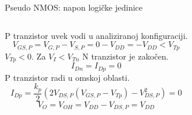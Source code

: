 \begin{frame}[label=09_2-s016]{Pseudo NMOS: napon logičke jedinice}
\begin{columns}[T,onlytextwidth]\centering {}P tranzistor uvek vodi u analiziranoj konfiguraciji.
\[V_{GS,P}=V_{G,P}-V_{S,P}=0-V_{DD}=-V_{DD}<V_{Tp}\]
$V_{Tp}<0$. Za $V_I<V_{Tn}$ N tranzistor je zakočen.
\[I_{Dn}=I_{Dp}=0\]
P tranzistor radi u omskoj oblasti.
\[I_{Dp}=\frac{k_p}2\left(2V_{DS,P}(V_{GS,P}-V_{Tp})-V_{DS,P}^2\right)=0\]
\[V_O=V_{OH}=V_{DD}-V_{DS,P}=V_{DD}\]
\end{columns}
\end{frame}
